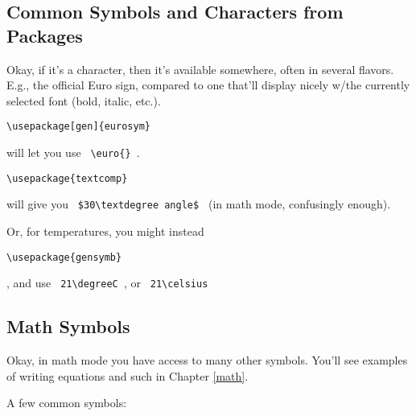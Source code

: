 \subsection{Common Symbols and Characters from Packages}

Okay, if it's a character, then it's available somewhere, often in several
flavors.  E.g., the official Euro sign, compared to one that'll display
nicely w/the currently selected font (bold, italic, etc.).

\begin{lstlisting}[language=Tex]
	\usepackage[gen]{eurosym}
\end{lstlisting}

will let you use \texttt{ \textbackslash{}euro\{\} }.

\begin{lstlisting}[language=Tex]
	\usepackage{textcomp}
\end{lstlisting}

will give you \texttt{ \$30\textbackslash{}textdegree angle\$ } (in math mode,
confusingly enough).

Or, for temperatures, you might instead

\begin{lstlisting}[language=Tex]
	\usepackage{gensymb}
\end{lstlisting}

, and use \texttt{ 21\textbackslash{}degree{}C }, or \texttt{
	21\textbackslash{}celsius }


\subsection{Math Symbols}
\label{intmathsymb}

Okay, in math mode you have access to many other symbols.  You'll see
examples of writing equations and such in Chapter \ref{math}. 

A few common symbols:

